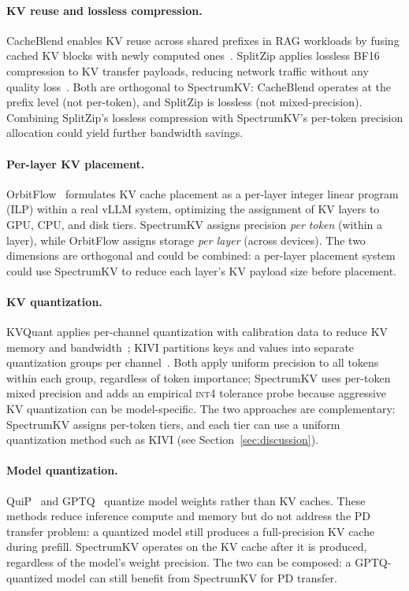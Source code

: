 \documentclass[11pt]{article}
\newcommand{\method}{SpectrumKV}
\newcommand{\intiv}{\textsc{int4}}
\theoremstyle{plain}
\theoremstyle{definition}
\begin{document}
\paragraph{KV reuse and lossless compression.}
CacheBlend enables KV reuse across shared prefixes in RAG workloads by fusing cached KV blocks with newly computed ones~\citep{cacheblend}.  SplitZip applies lossless BF16 compression to KV transfer payloads, reducing network traffic without any quality loss~\citep{splitzip}.  Both are orthogonal to \method{}: CacheBlend operates at the prefix level (not per-token), and SplitZip is lossless (not mixed-precision).  Combining SplitZip's lossless compression with \method{}'s per-token precision allocation could yield further bandwidth savings.

\paragraph{Per-layer KV placement.}
OrbitFlow~\citep{orbitflow} formulates KV cache placement as a per-layer integer linear program (ILP) within a real vLLM system, optimizing the assignment of KV layers to GPU, CPU, and disk tiers.  \method{} assigns precision \emph{per token} (within a layer), while OrbitFlow assigns storage \emph{per layer} (across devices).  The two dimensions are orthogonal and could be combined: a per-layer placement system could use \method{} to reduce each layer's KV payload size before placement.

\paragraph{KV quantization.}
KVQuant applies per-channel quantization with calibration data to reduce KV memory and bandwidth~\citep{kvquant}; KIVI partitions keys and values into separate quantization groups per channel~\citep{kivi}.  Both apply uniform precision to all tokens within each group, regardless of token importance; \method{} uses per-token mixed precision and adds an empirical \intiv{} tolerance probe because aggressive KV quantization can be model-specific.  The two approaches are complementary: \method{} assigns per-token tiers, and each tier can use a uniform quantization method such as KIVI (see Section~\ref{sec:discussion}).

\paragraph{Model quantization.}
QuiP~\citep{quip} and GPTQ~\citep{gptq} quantize model weights rather than KV caches.  These methods reduce inference compute and memory but do not address the PD transfer problem: a quantized model still produces a full-precision KV cache during prefill.  \method{} operates on the KV cache after it is produced, regardless of the model's weight precision.  The two can be composed: a GPTQ-quantized model can still benefit from \method{} for PD transfer.
\end{document}
